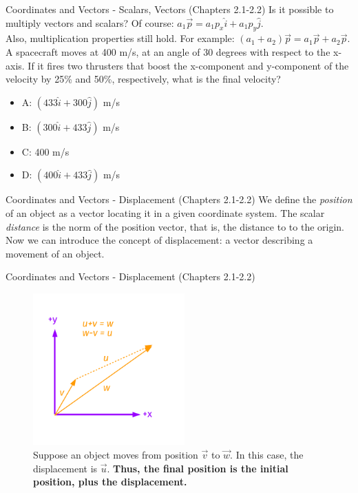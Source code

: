 \documentclass{beamer}
\begin{document}
\begin{frame}{Coordinates and Vectors - Scalars, Vectors (Chapters 2.1-2.2)}
Is it possible to multiply vectors and scalars?  Of course: $a_1\vec{p} = a_1p_x\hat{i}+a_1p_y\hat{j}$.\\
\vspace{0.2cm}
Also, multiplication properties still hold.  For example: $(a_1+a_2)\vec{p} = a_1\vec{p}+a_2\vec{p}$. \\
\vspace{0.2cm}
\small
A spacecraft moves at 400 m/s, at an angle of 30 degrees with respect to the x-axis.  If it fires two thrusters that boost the x-component and y-component of the velocity by 25\% and 50\%, respectively, what is the final velocity?
\begin{itemize}
\item A: $(433\hat{i}+300\hat{j})$ m/s
\item B: $(300\hat{i}+433\hat{j})$ m/s
\item C: 400 m/s
\item D: $(400\hat{i}+433\hat{j})$ m/s
\end{itemize}
\end{frame}

\begin{frame}{Coordinates and Vectors - Displacement (Chapters 2.1-2.2)}
We define the \textit{position} of an object as a vector locating it in a given coordinate system.  The scalar \textit{distance} is the norm of the position vector, that is, the distance to to the origin. \\
\vspace{0.5cm}
Now we can introduce the concept of \alert{displacement}: a vector describing a movement of an object.
\end{frame}

\begin{frame}{Coordinates and Vectors - Displacement (Chapters 2.1-2.2)}
\begin{figure}
\centering
\includegraphics[width=0.52\textwidth]{figures/Vectors4.pdf}
\caption{\label{fig:displacement} Suppose an object moves from position $\vec{v}$ to $\vec{w}$.  In this case, the \alert{displacement} is $\vec{u}$. \textbf{Thus, the final position is the initial position, plus the displacement.}}
\end{figure}
\end{frame}
\end{document}
